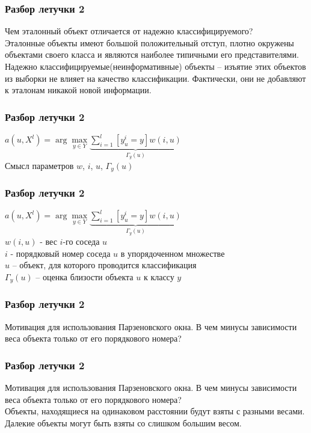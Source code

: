 \documentclass[12pt]{beamer}
\begin{document}
\begin{frame}\frametitle{Разбор летучки 2}
Чем эталонный объект отличается от надежно классифицируемого?\\
\vspace{8mm}
Эталонные объекты имеют большой положительный отступ, плотно окружены
объектами своего класса и являются наиболее типичными его представителями.\\
\vspace{5mm}
Надежно классифицируемые(неинформативные) объекты -- изъятие
этих объектов из выборки не влияет на качество классификации. Фактически, они не добавляют к эталонам никакой новой информации. 

\end{frame}


\begin{frame}\frametitle{Разбор летучки 2}
${a(u, X^l) = \arg\max\limits_{y \in Y} \underbrace{\sum\limits_{i=1}^l [y_u^i = y]w(i, u)}_{\Gamma_y(u)} }$\\
Смысл параметров $w$, $i$, $u$, $\Gamma_y(u)$
\end{frame}

\begin{frame}\frametitle{Разбор летучки 2}
${a(u, X^l) = \arg\max\limits_{y \in Y} \underbrace{\sum\limits_{i=1}^l [y_u^i = y]w(i, u)}_{\Gamma_y(u)} }$\\
$w(i, u)$ - вес $i$-го соседа $u$ \\
$i$ - порядковый номер соседа $u$ в упорядоченном множестве\\
$u$ -- объект, для которого проводится классификация\\
$\Gamma_y(u)$ -- оценка близости объекта $u$ к классу ${y}$
\end{frame}

\begin{frame}\frametitle{Разбор летучки 2}
Мотивация для использования Парзеновского окна. В чем минусы зависимости веса объекта только от его порядкового номера?
\end{frame}

\begin{frame}\frametitle{Разбор летучки 2}
Мотивация для использования Парзеновского окна. В чем минусы зависимости веса объекта только от его порядкового номера?\\
\vspace{5mm}
Объекты, находящиеся на одинаковом расстоянии будут взяты с разными весами. 
Далекие объекты могут быть взяты со слишком большим весом.
\end{frame}
\end{document}
